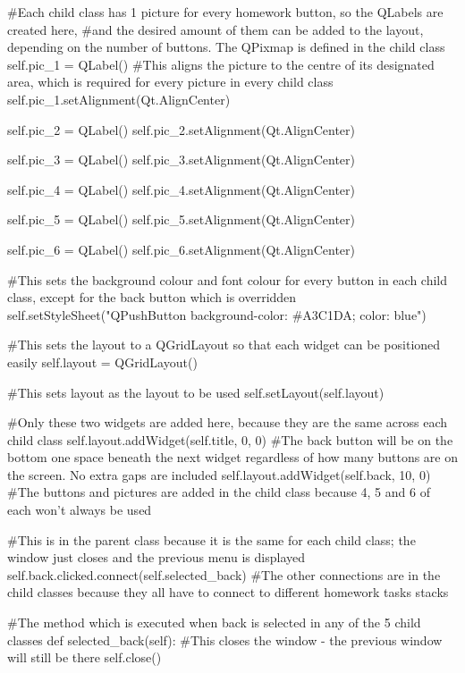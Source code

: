 \begin{landscape}
\begin{python}
        #Each child class has 1 picture for every homework button, so the QLabels are created here,
        #and the desired amount of them can be added to the layout, depending on the number of buttons. The QPixmap is defined in the child class
        self.pic_1 = QLabel()
        #This aligns the picture to the centre of its designated area, which is required for every picture in every child class
        self.pic_1.setAlignment(Qt.AlignCenter)

        self.pic_2 = QLabel()
        self.pic_2.setAlignment(Qt.AlignCenter)
        
        self.pic_3 = QLabel()
        self.pic_3.setAlignment(Qt.AlignCenter)
        
        self.pic_4 = QLabel()
        self.pic_4.setAlignment(Qt.AlignCenter)

        self.pic_5 = QLabel()
        self.pic_5.setAlignment(Qt.AlignCenter)
        
        self.pic_6 = QLabel()
        self.pic_6.setAlignment(Qt.AlignCenter)

        #This sets the background colour and font colour for every button in each child class, except for the back button which is overridden
        self.setStyleSheet("QPushButton {background-color: #A3C1DA; color: blue}")   

        #This sets the layout to a QGridLayout so that each widget can be positioned easily
        self.layout = QGridLayout()

        #This sets layout as the layout to be used
        self.setLayout(self.layout)

        #Only these two widgets are added here, because they are the same across each child class
        self.layout.addWidget(self.title, 0, 0)
        #The back button will be on the bottom one space beneath the next widget regardless of how many buttons are on the screen. No extra gaps are included
        self.layout.addWidget(self.back, 10, 0)
        #The buttons and pictures are added in the child class because 4, 5 and 6 of each won't always be used

        #This is in the parent class because it is the same for each child class; the window just closes and the previous menu is displayed
        self.back.clicked.connect(self.selected_back)
        #The other connections are in the child classes because they all have to connect to different homework tasks stacks

    #The method which is executed when back is selected in any of the 5 child classes
    def selected_back(self):
        #This closes the window - the previous window will still be there
        self.close()
\end{python}


\end{landscape}
